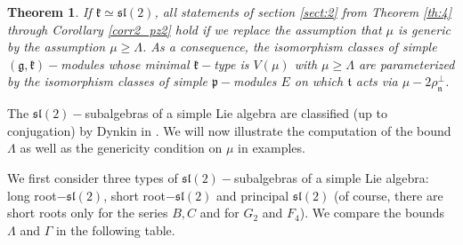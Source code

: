 \documentclass[default]{./styles/svmult}
\newtheorem{theo}{Theorem}[section]
\renewcommand{\gg}{\mathfrak{g}}
\newcommand{\kk}{\mathfrak{k}}
\newcommand{\nn}{\mathfrak{n}}
\newcommand{\pp}{\mathfrak{p}}
\renewcommand{\tt}{\mathfrak{t}}
\renewcommand{\sl}{\mathfrak{sl}}
\begin{document}
\begin{theo}\label{th:5}
 If $\kk \simeq \sl(2)$, all statements of section \ref{sect:2} from Theorem \ref{th:4} through Corollary \ref{corr2_pz2} hold if we replace the assumption that $\mu$ is generic by the assumption $\mu \geq \Lambda$. As a consequence, the isomorphism classes of simple $(\gg,\kk)-$modules whose minimal $\kk-$type is $V(\mu)$ with $\mu \geq \Lambda$ are parameterized by the isomorphism classes of simple $\pp-$modules $E$ on which $\tt$ acts via $\mu - 2\rho_{\nn}^{\perp}$. 
\end{theo}

The $\sl(2)-$subalgebras of a simple Lie algebra are classified (up to conjugation) by Dynkin in \cite{D}. We will now illustrate the computation of the bound $\Lambda$ as well as the genericity condition on $\mu$ in examples.

We first consider three types of $\sl(2)-$subalgebras of a simple Lie algebra: long root$-\sl(2)$, short root$-\sl(2)$ and principal $\sl(2)$ (of course, there are short roots only for the series $B, C$ and for $G_2$ and $F_4$). We compare the bounds $\Lambda$ and $\Gamma$ in the following table.
\end{document}
